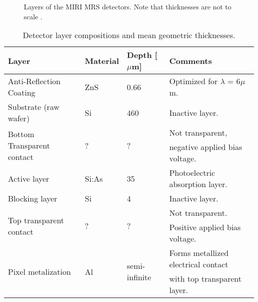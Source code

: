 \begin{figure}
	\centering
	\begin{scriptsize}
	\end{scriptsize}
	\caption{Layers of the MIRI MRS detectors. Note that thicknesses are not to scale \parencite{MIRI7}.}
	\label{fig:layers}
\end{figure}
\begin{table}[h]
	\centering
	\begin{footnotesize}
	\begin{tabular}{llll}
		\toprule
		\textbf{Layer} & \textbf{Material} & \textbf{Depth [$\mu$m]} & \textbf{Comments}\\
		\midrule 
		Anti-Reflection Coating & ZnS & 0.66 & Optimized for $\lambda$ = 6$\mu$m.\\
		Substrate (raw wafer) & Si & 460 & Inactive layer.\\
		\multirow{2}{*}{Bottom Transparent contact} & \multirow{2}{*}{?} & \multirow{2}{*}{?} & Not transparent,\\&&& negative applied bias voltage.\\
		Active layer & Si:As & 35 & Photoelectric absorption layer.\\
		Blocking layer & Si & 4 & Inactive layer.\\
		\multirow{2}{*}{Top transparent contact} & \multirow{2}{*}{?} & \multirow{2}{*}{?} & Not transparent.\\&&& Positive applied bias voltage.\\
		\multirow{2}{*}{Pixel metalization} & \multirow{2}{*}{Al} & \multirow{2}{*}{semi-infinite} & Forms metallized electrical contact\\ &&&with top transparent layer.\\
		\bottomrule
	\end{tabular}
	\end{footnotesize}
	\caption{Detector layer compositions and mean geometric thicknesses.}
	\label{tab:layers}
\end{table}

